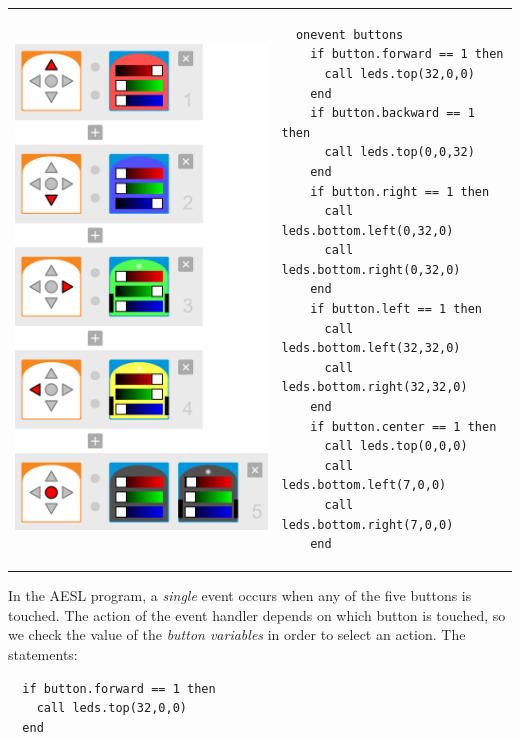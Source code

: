\documentclass[11pt,a4paper,english]{report}
\begin{document}
\begin{center}
\begin{tabular}{ll}
\includegraphics[width=.4\textwidth]{colors-multiple-full} &
\begin{minipage}[b]{.5\textwidth}
\begin{footnotesize}
\begin{verbatim}
  onevent buttons
    if button.forward == 1 then
      call leds.top(32,0,0)
    end
    if button.backward == 1 then
      call leds.top(0,0,32)
    end
    if button.right == 1 then
      call leds.bottom.left(0,32,0)
      call leds.bottom.right(0,32,0)
    end
    if button.left == 1 then
      call leds.bottom.left(32,32,0)
      call leds.bottom.right(32,32,0)
    end
    if button.center == 1 then
      call leds.top(0,0,0)
      call leds.bottom.left(7,0,0)
      call leds.bottom.right(7,0,0)
    end
\end{verbatim}
\end{footnotesize}
\vspace*{5ex}
\end{minipage}
\end{tabular}
\end{center}

In the AESL program, a \emph{single} event occurs when any of the five
buttons is touched. The action of the event handler 
depends on which button is touched, so we check the value of the
\emph{button variables} in order to select an action. The statements:

\begin{footnotesize}
\begin{verbatim}
  if button.forward == 1 then
    call leds.top(32,0,0)
  end
\end{verbatim}
\end{footnotesize}
\end{document}
